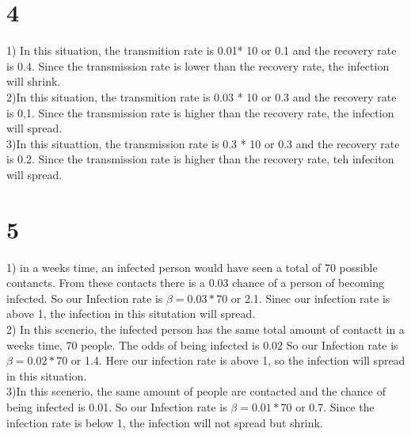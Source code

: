 \documentclass[12pt,english]{article}
\begin{document}
\section*{4}
1) In this situation, the transmition rate is 0.01* 10 or 0.1 and the recovery rate is 0.4. Since the transmission rate is lower than the recovery rate, the infection will shrink.\\
2)In this situation, the transmition rate is 0.03 * 10 or 0.3 and the recovery rate is 0,1. Since the transmission rate is higher than the recovery rate, the infection will spread.\\
3)In this situattion, the transmission rate is 0.3 * 10 or 0.3 and the recovery rate is 0.2. Since the transmission rate is higher than the recovery rate, teh infeciton will spread.
\section*{5}
1) in a weeks time, an infected person would have seen a total of 70 possible contancts. From these contacts there is a 0.03 chance of a person of becoming infected. So our Infection rate is $\beta = 0.03 * 70$ or 2.1. Sinec our infection rate is above 1, the infection in this situtation will spread.\\
2) In this scenerio, the infected person has the same total amount of contactt in a weeks time, 70 people. The odds of being infected is 0.02 So our Infection rate is $\beta = 0.02 * 70$ or 1.4. Here our infection rate is above 1, so the infection will spread in this situation.\\
3)In this scenerio, the same amount of people are contacted and the chance of being infected is 0.01. So our Infection rate is $\beta = 0.01 * 70$ or 0.7. Since the infection rate is below 1, the infection will not spread but shrink.
\end{document}
